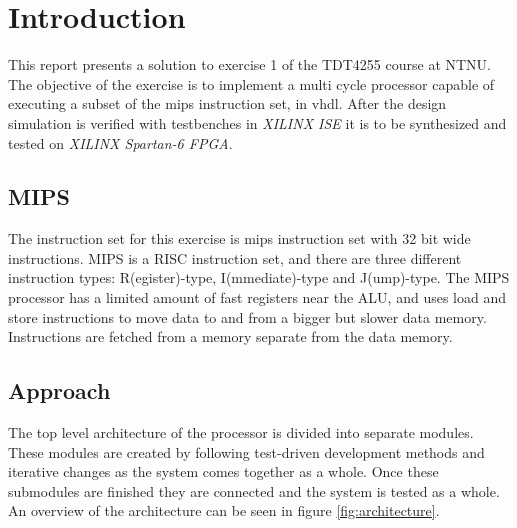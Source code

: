 \chapter{Introduction}
This report presents a solution to exercise 1 of the TDT4255 course at NTNU.
The objective of the exercise is to implement a multi cycle processor capable of executing a subset of the \gls{mips} instruction set, in \gls{vhdl}.
After the design simulation is verified with testbenches in \textit{XILINX ISE} it is to be synthesized and tested on \textit{XILINX Spartan-6 FPGA}.

\section{MIPS}
The instruction set for this exercise is \gls{mips} instruction set with 32 bit wide instructions.
MIPS is a RISC instruction set,
and there are three different instruction types: R(egister)-type, I(mmediate)-type and J(ump)-type.
The MIPS processor has a limited amount of fast registers near the ALU,
and uses load and store instructions to move data to and from a bigger but slower data memory.
Instructions are fetched from a memory separate from the data memory.

\section{Approach}
The top level architecture of the processor is divided into separate modules.
These modules are created by following test-driven development methods and iterative changes as the system comes together as a whole.
Once these submodules are finished they are connected and the system is tested as a whole.
An overview of the architecture can be seen in figure \ref{fig:architecture}.

